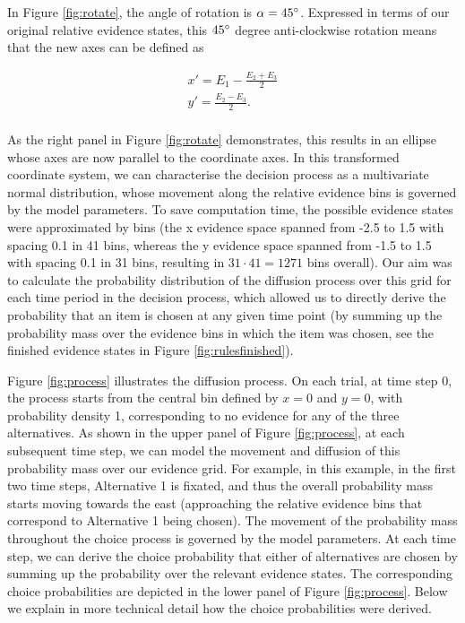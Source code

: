 \documentclass[11pt,a4paper]{article}
\begin{document}
In Figure \ref{fig:rotate}, the angle of rotation is $\alpha = 45\degree$. Expressed in terms of our original relative evidence states, this $45\degree$ degree anti-clockwise rotation means that the new axes can be defined as

\begin{equation}
\begin{array}{l}
\displaystyle x' = E_{1}-\frac{E_{2}+E_{3}}{2}\\
\displaystyle y' = \frac{E_{2}-E_{3}}{2}.\\
\end{array} 
\label{eq:axes3}
\end{equation}
 
As the right panel in Figure \ref{fig:rotate} demonstrates, this results in an ellipse whose axes are now parallel to the coordinate axes. In this transformed coordinate system, we can characterise the decision process as a multivariate normal distribution, whose movement along the relative evidence bins is governed by the model parameters. To save computation time, the possible evidence states were approximated by bins (the x evidence space spanned from -2.5 to 1.5 with spacing 0.1 in 41 bins, whereas the y evidence space spanned from -1.5 to 1.5 with spacing 0.1 in 31 bins, resulting in $31\cdot41 = 1271$ bins overall). Our aim was to calculate the probability distribution of the diffusion process over this grid for each time period in the decision process, which allowed us to directly derive the probability that an item is chosen at any given time point (by summing up the probability mass over the evidence bins in which the item was chosen, see the finished evidence states in Figure \ref{fig:rulesfinished}).

Figure \ref{fig:process} illustrates the diffusion process. On each trial, at time step 0, the process starts from the central bin defined by $x = 0$ and $y = 0$, with probability density 1, corresponding to no evidence for any of the three alternatives. As shown in the upper panel of Figure \ref{fig:process}, at each subsequent time step, we can model the movement and diffusion of this probability mass over our evidence grid. For example, in this example, in the first two time steps, Alternative 1 is fixated, and thus the overall probability mass starts moving towards the east (approaching the relative evidence bins that correspond to Alternative 1 being chosen). The movement of the probability mass throughout the choice process is governed by the model parameters. At each time step, we can derive the choice probability that either of alternatives are chosen by summing up the probability over the relevant evidence states. The corresponding choice probabilities are depicted in the lower panel of Figure \ref{fig:process}. Below we explain in more technical detail how the choice probabilities were derived.
\end{document}

